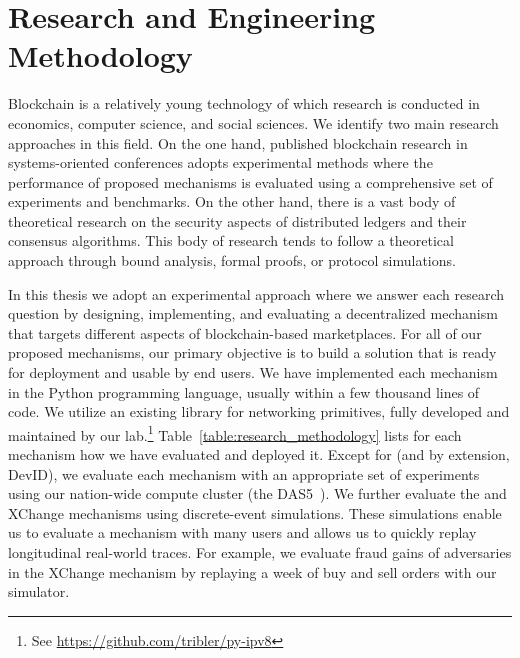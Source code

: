 \section{Research and Engineering Methodology}
Blockchain is a relatively young technology of which research is conducted in economics, computer science, and social sciences.
We identify two main research approaches in this field.
On the one hand, published blockchain research in systems-oriented conferences adopts experimental methods where the performance of proposed mechanisms is evaluated using a comprehensive set of experiments and benchmarks.
On the other hand, there is a vast body of theoretical research on the security aspects of distributed ledgers and their consensus algorithms.
This body of research tends to follow a theoretical approach through bound analysis, formal proofs, or protocol simulations.

In this thesis we adopt an experimental approach where we answer each research question by designing, implementing, and evaluating a decentralized mechanism that targets different aspects of blockchain-based marketplaces.
For all of our proposed mechanisms, our primary objective is to build a solution that is ready for deployment and usable by end users.
We have implemented each mechanism in the Python programming language, usually within a few thousand lines of code.
We utilize an existing library for networking primitives, fully developed and maintained by our lab.\footnote{See \url{https://github.com/tribler/py-ipv8}}
Table~\ref{table:research_methodology} lists for each mechanism how we have evaluated and deployed it.
Except for \Dappcoder{} (and by extension, DevID), we evaluate each mechanism with an appropriate set of experiments using our nation-wide compute cluster (the DAS5~\cite{bal2016medium}).
We further evaluate the \TrustChain{} and XChange mechanisms using discrete-event simulations.
These simulations enable us to evaluate a mechanism with many users and allows us to quickly replay longitudinal real-world traces.
For example, we evaluate fraud gains of adversaries in the XChange mechanism by replaying a week of buy and sell orders with our simulator.

